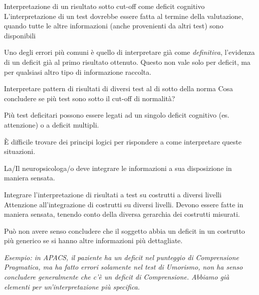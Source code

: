 \documentclass[
  ignorenonframetext,
  aspectratio=169,
]{beamer}
\begin{document}
\begin{frame}{\normalsize Interpretazione di un risultato sotto cut-off
come deficit cognitivo}
\label{interpretazione-di-un-risultato-sotto-cut-off-come-deficit-cognitivo-2}
L'interpretazione di un test dovrebbe essere fatta al termine della
valutazione, quando tutte le altre informazioni (anche provenienti da
altri test) sono disponibili

Uno degli errori più comuni è quello di interpretare già come
\emph{definitiva}, l'evidenza di un deficit già al primo risultato
ottenuto. Questo non vale solo per deficit, ma per qualsiasi altro tipo
di informazione raccolta.
\end{frame}

\begin{frame}{\normalsize Interpretare pattern di risultati di diversi
test al di sotto della norma}
\label{interpretare-pattern-di-risultati-di-diversi-test-al-di-sotto-della-norma}
Cosa concludere se più test sono sotto il cut-off di normalità?

Più test deficitari possono essere legati ad un singolo deficit
cognitivo (es. attenzione) o a deficit multipli. \pause

È difficile trovare dei principi logici per rispondere a come
interpretare queste situazioni. \pause

La/Il neuropsicologa/o deve integrare le informazioni a sua disposizione
in maniera sensata.
\end{frame}

\begin{frame}{\normalsize Integrare l'interpretazione di risultati a
test su costrutti a diversi livelli}
\label{integrare-linterpretazione-di-risultati-a-test-su-costrutti-a-diversi-livelli}
Attenzione all'integrazione di costrutti su diversi livelli. Devono
essere fatte in maniera sensata, tenendo conto della diversa gerarchia
dei costrutti misurati.

Può non avere senso concludere che il soggetto abbia un deficit in un
costrutto più generico se si hanno altre informazioni più dettagliate.

\pause

\emph{Esempio: in APACS, il paziente ha un deficit nel punteggio di Comprensione Pragmatica, ma ha fatto errori solamente nel test di Umorismo, non ha senso concludere generalmente che c’è un deficit di Comprensione. Abbiamo già elementi per un’interpretazione più specifica.}
\end{frame}
\end{document}
